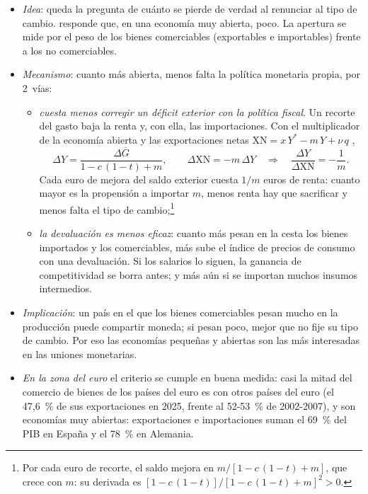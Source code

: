 \documentclass[11pt]{article}
\begin{document}
\begin{itemize}
\item \emph{Idea}: queda la pregunta de cuánto se pierde de verdad al renunciar al tipo de cambio. \textcite{McKinnon1963Optimum} responde que, en una economía muy abierta, poco. La apertura se mide por el peso de los bienes comerciables (exportables e importables) frente a los no comerciables.
\item \emph{Mecanismo}: cuanto más abierta, menos falta la política monetaria propia, por 2~vías:
  \begin{itemize}
  \item \emph{cuesta menos corregir un déficit exterior con la política fiscal}. Un recorte del gasto baja la renta y, con ella, las importaciones. Con el multiplicador de la economía abierta y las exportaciones netas $\mathrm{XN}=x\,Y^*-m\,Y+\nu\,q$ ,
    \begin{equation}
    \Delta Y=\frac{\Delta\overline{G}}{1-c\,(1-t)+m},\qquad
    \Delta\mathrm{XN}=-m\,\Delta Y\quad\Longrightarrow\quad
    \frac{\Delta Y}{\Delta\mathrm{XN}}=-\frac{1}{m}.
    \label{eq:mckinnon}
    \end{equation}
    Cada euro de mejora del saldo exterior cuesta $1/m$ euros de renta: cuanto mayor es la propensión a importar $m$, menos renta hay que sacrificar y menos falta el tipo de cambio;\footnote{Por cada euro de recorte, el saldo mejora en $m/[1-c\,(1-t)+m]$, que crece con $m$: su derivada es $[1-c\,(1-t)]/[1-c\,(1-t)+m]^2>0$.}
  \item \emph{la devaluación es menos eficaz}: cuanto más pesan en la cesta los bienes importados y los comerciables, más sube el índice de precios de consumo con una devaluación. Si los salarios lo siguen, la ganancia de competitividad se borra antes; y más aún si se importan muchos insumos intermedios.
  \end{itemize}
\item \emph{Implicación}: un país en el que los bienes comerciables pesan mucho en la producción puede compartir moneda; si pesan poco, mejor que no fije su tipo de cambio. Por eso las economías pequeñas y abiertas son las más interesadas en las uniones monetarias.
\item \emph{En la zona del euro} el criterio se cumple en buena medida: casi la mitad del comercio de bienes de los países del euro es con otros países del euro (el 47,6~\% de sus exportaciones en 2025, frente al 52-53~\% de 2002-2007)\nocite{Eurostat2026ExtStEasitc}, y son economías muy abiertas: exportaciones e importaciones suman el 69~\% del PIB en España y el 78~\% en Alemania\nocite{Eurostat2026Nama10gdp}.
\end{itemize}
\end{document}
